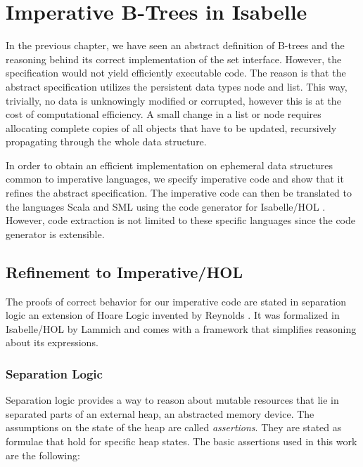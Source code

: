
\chapter{Imperative B-Trees in Isabelle}\label{chapter:imp-set}

In the previous chapter, we have seen
an abstract definition of B-trees and the reasoning
behind its correct implementation of the set interface.
However, the specification would not yield 
efficiently executable code.
The reason is that the abstract specification utilizes
the persistent data types node and list.
This way, trivially, no data is unknowingly
modified or corrupted,
however this is at the cost of computational efficiency.
A small change in a list or node
requires allocating complete copies of all objects that have to be updated,
recursively propagating through the whole data structure.

In order to obtain an efficient implementation
on ephemeral data structures common to imperative languages,
we specify imperative code and show that
it refines the abstract specification.
The imperative code can then be translated to
the languages Scala \parencite{OderskyScala} and SML \parencite{DBLP:books/daglib/0069232}
using the code generator
for Isabelle/HOL \parencite{Haftmann07acode}.
However, code extraction is not limited
to these specific languages
since the code generator is extensible.

\section{Refinement to Imperative/HOL}

The proofs of correct behavior for our imperative
code are stated in separation logic
an extension of Hoare Logic invented by Reynolds \parencite{DBLP:conf/lics/Reynolds02}.
It was formalized in Isabelle/HOL by Lammich \parencite{DBLP:journals/jar/Lammich19}
and comes with a framework that simplifies reasoning about
its expressions.

\subsection{Separation Logic}

Separation logic provides a way to reason about mutable resources
that lie in separated parts of an external heap,
an abstracted memory device.
The assumptions on the state of the heap are called \textit{assertions}.
They are stated as formulae that hold for specific heap states.
The basic assertions used in this work are the following:

